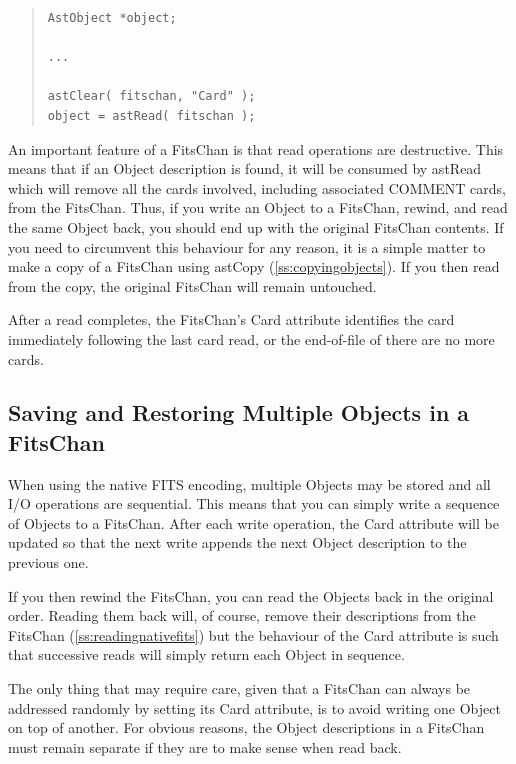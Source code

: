 \documentclass[twoside,11pt]{article}
\newcommand{\htmlref}[2]{#1}
\newcommand{\secref}[1]{\S\ref{#1}}
\renewcommand{\secref}[1]{\ref{#1}}
\begin{document}
\begin{quote}
\small
\begin{verbatim}
AstObject *object;

...

astClear( fitschan, "Card" );
object = astRead( fitschan );
\end{verbatim}
\normalsize
\end{quote}

An important feature of a FitsChan is that read operations are
destructive. This means that if an Object description is found, it
will be consumed by astRead which will remove all the cards involved,
including associated COMMENT cards, from the FitsChan. Thus, if you
write an Object to a FitsChan, rewind, and read the same Object back,
you should end up with the original FitsChan contents.  If you need to
circumvent this behaviour for any reason, it is a simple matter to
make a copy of a FitsChan using \htmlref{astCopy}{astCopy}
(\secref{ss:copyingobjects}). If you then read from the copy, the
original FitsChan will remain untouched.

After a read completes, the FitsChan's \htmlref{Card}{Card} attribute identifies the
card immediately following the last card read, or the end-of-file of
there are no more cards.

\subsection{Saving and Restoring Multiple Objects in a FitsChan}

When using the native FITS encoding, multiple Objects may be stored
and all I/O operations are sequential.  This means that you can simply
write a sequence of Objects to a \htmlref{FitsChan}{FitsChan}. After each write operation,
the \htmlref{Card}{Card} attribute will be updated so that the next write appends the
next \htmlref{Object}{Object} description to the previous one.

If you then rewind the FitsChan, you can read the Objects back in the
original order. Reading them back will, of course, remove their
descriptions from the FitsChan (\secref{ss:readingnativefits}) but the
behaviour of the Card attribute is such that successive reads will
simply return each Object in sequence.

The only thing that may require care, given that a FitsChan can always
be addressed randomly by setting its Card attribute, is to avoid
writing one Object on top of another. For obvious reasons, the Object
descriptions in a FitsChan must remain separate if they are to make
sense when read back.
\end{document}
